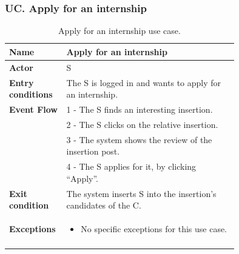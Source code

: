 \subsubsection*{UC\cuc . Apply for an internship}
\begin{center}
    \begin{longtable}{|l|p{0.75\linewidth}|}
        \hline
        \textbf{Name}               & Apply for an internship\\
        \hline
        \textbf{Actor}              & S\\
        \hline
        \textbf{Entry conditions}   & The S is logged in and wants to apply for an internship.\\
        \hline
        \textbf{Event Flow}         & 1 - The S finds an interesting insertion. \\
        & 2 - The S clicks on the relative insertion. \\
        & 3 - The system shows the review of the insertion post. \\
        & 4 - The S applies for it, by clicking “Apply”. \\
        \hline
        \textbf{Exit condition}   & The system inserts S into the insertion’s candidates of the C. \\       
        \hline
        \textbf{Exceptions}       & \begin{itemize}
            \item No specific exceptions for this use case.
        \end{itemize}\\
        \hline
        \caption{Apply for an internship use case.}
        \label{tab: apply_for_an_internship_use_case}
    \end{longtable}
\end{center}


